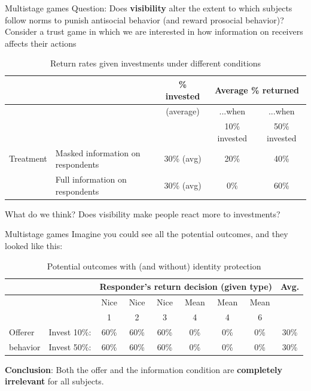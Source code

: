 \documentclass[
  11pt,
  ignorenonframetext,
]{beamer}
\begin{document}
\begin{frame}{Multistage games}
\protect\hypertarget{multistage-games-1}{}
Question: Does \textbf{visibility} alter the extent to which subjects
follow norms to punish antisocial behavior (and reward prosocial
behavior)? Consider a trust game in which we are interested in how
information on receivers affects their actions

\begin{table}[h!] \scriptsize
  \centering
  \caption{Return rates given investments under different conditions}
    \begin{tabular}{lp{3.8cm}|c|cc}
          &                                         & \% invested   & \multicolumn{2}{c}{Average \% returned}  \\ \hline 
          &                                         & (average)     & ...when       & ...when \\ 
          &                                         &               & 10\% invested     & 50\% invested \\ \hline \hline 
Treatment & Masked information on respondents       & 30\% (avg)    & 20\%          & 40\% \\
          & Full information on respondents         & 30\% (avg)    & 0\%           & 60\% \\
    \end{tabular}
\end{table}

What do we think? Does visibility make people react more to investments?
\end{frame}

\begin{frame}{Multistage games}
\protect\hypertarget{multistage-games-2}{}
Imagine you could see all the potential outcomes, and they looked like
this:

\begin{table}[h!] \scriptsize
  \centering
  \caption{Potential outcomes with (and without) identity protection}
    \begin{tabular}{ll|cccccc|c} \footnotesize
          &       & \multicolumn{6}{c}{Responder's return decision (given type)}& Avg.  \\ \hline 
          &       & Nice  & Nice  & Nice  & Mean  & Mean  & Mean \\ 
          & & 1&2&3&4&4&6\\ \hline \hline 
    Offerer  & Invest 10\%: & 60\%      &  60\%     &  60\%     & 0\%   & 0\%   & 0\% & 30\%\\
    behavior      & Invest 50\%: & 60\% & 60\% & 60\% &    0\%   &    0\%   &  0\% & 30\%\\
    \end{tabular}%
\end{table}

\textbf{Conclusion}: Both the offer and the information condition are
\textbf{completely irrelevant} for all subjects.
\end{frame}
\end{document}
